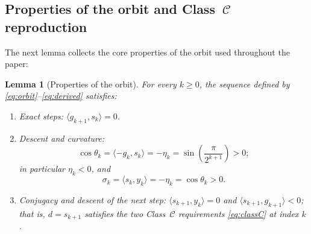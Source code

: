 \documentclass[11pt]{article}
\newtheorem{lemma}[theorem]{Lemma}
\newcommand{\ip}[2]{\langle #1,#2\rangle}
\begin{document}
\subsection{Properties of the orbit and Class~\texorpdfstring{$\mathcal C$}{C} reproduction}

The next lemma collects the core properties of the orbit used throughout the paper:

\begin{lemma}[Properties of the orbit]
\label{lem:orbit}
For every $k \ge 0$, the sequence defined by \eqref{eq:orbit}--\eqref{eq:derived} satisfies:
\begin{enumerate}
\item[(i)] \emph{Exact steps:} $\ip{g_{k+1}}{s_k} = 0$.
\item[(ii)] \emph{Descent and curvature:}
\begin{equation}
\label{eq:costhetak}
\cos\theta_k = \ip{-g_k}{s_k} = -\eta_k = \sin\left(\frac{\pi}{2^{k+1}}\right) > 0;
\end{equation}
in particular $\eta_k < 0$, and
\begin{equation}
\label{eq:sigmak}
\sigma_k = \ip{s_k}{y_k} = -\eta_k = \cos\theta_k > 0.
\end{equation}
\item[(iii)] \emph{Conjugacy and descent of the next step:} $\ip{s_{k+1}}{y_k} = 0$ and $\ip{s_{k+1}}{g_{k+1}} < 0$; that is, $d = s_{k+1}$ satisfies the two Class~$\mathcal C$ requirements \eqref{eq:classC} at index $k$.
\end{enumerate}
\end{lemma}
\end{document}
